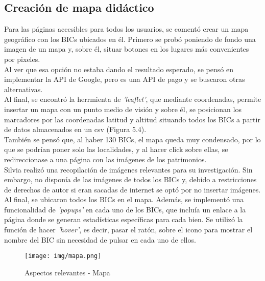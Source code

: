 \subsection{Creación de mapa didáctico}
Para las páginas accesibles para todos los usuarios, se comentó crear un mapa geográfico con los BICs ubicados en él. Primero se probó poniendo de fondo una imagen de un mapa y, sobre él, situar botones en los lugares más convenientes por pixeles. \\
Al ver que esa opción no estaba dando el resultado esperado, se pensó en implementar la API de Google, pero es una API de pago y se buscaron otras alternativas. \\
Al final, se encontró la herrmienta de \textit{'leaflet'}, que mediante coordenadas, permite insertar un mapa con un punto medio de visión y sobre él, se posicionan los marcadores por las coordenadas latitud y altitud situando todos los BICs a partir de datos almacenados en un csv (Figura 5.4).\\
También se pensó que, al haber 130 BICs, el mapa queda muy condensado, por lo que se podrían poner solo las localidades, y al hacer click sobre ellas, se redireccionase a una página con las imágenes de los patrimonios.\\
Silvia realizó una recopilación de imágenes relevantes para su investigación. Sin embargo, no disponía de las imágenes de todos los BICs y, debido a restricciones de derechos de autor si eran sacadas de internet se optó por no insertar imágenes.\\
Al final, se ubicaron todos los BICs en el mapa. 
Además, se implementó una funcionalidad de \textit{'popups'} en cada uno de los BICs, que incluía un enlace a la página donde se generan estadísticas específicas para cada bien. Se utilizó la función de hacer \textit{'hover'}, es decir, pasar el ratón, sobre el icono para mostrar el nombre del BIC sin necesidad de pulsar en cada uno de ellos.
\begin{figure}[h!]
    \centering
    \texttt{[image: img/mapa.png]} \\
    \caption{Aspectos relevantes - Mapa}
    \label{Aspectos relevantes - Mapa}
\end{figure}
